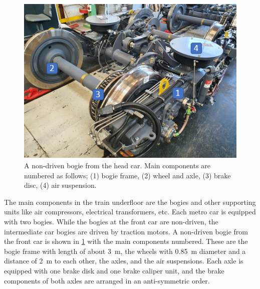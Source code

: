 \begin{figure}[H]
	\centering
	\includegraphics{fig/running_bogie_with_labels.PNG}
	\caption{A non-driven bogie from the head car. Main components are numbered as follows; (1) bogie frame, (2) wheel and axle, (3) brake disc, (4) air suspension.}
	\label{fig:bogie_foto}
\end{figure}

The main components in the train underfloor are the bogies and other supporting units like air compressors, electrical transformers, etc.
Each metro car is equipped with two bogies. While the bogies at the front car are non-driven, the intermediate car bogies are driven by traction motors. A non-driven bogie from the front car is shown in \cref{fig:bogie_foto} with the main components numbered. These are the bogie frame with length of about \SI{3}{\meter}, the wheels with \SI{0.85}{\meter} diameter and a distance of \SI{2}{\meter} to each other, the axles, and the air suspensions. Each axle is equipped with one brake disk and one brake caliper unit, and the brake components of both axles are arranged in an anti-symmetric order.

